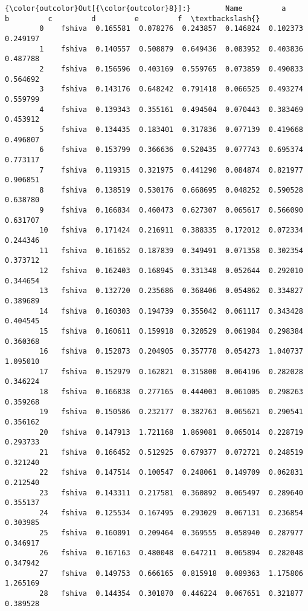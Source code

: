 \documentclass[11pt]{article}
\begin{document}
\begin{Verbatim}[commandchars=\\\{\}]
{\color{outcolor}Out[{\color{outcolor}8}]:}        Name         a         b         c         d         e         f  \textbackslash{}
        0    fshiva  0.165581  0.078276  0.243857  0.146824  0.102373  0.249197   
        1    fshiva  0.140557  0.508879  0.649436  0.083952  0.403836  0.487788   
        2    fshiva  0.156596  0.403169  0.559765  0.073859  0.490833  0.564692   
        3    fshiva  0.143176  0.648242  0.791418  0.066525  0.493274  0.559799   
        4    fshiva  0.139343  0.355161  0.494504  0.070443  0.383469  0.453912   
        5    fshiva  0.134435  0.183401  0.317836  0.077139  0.419668  0.496807   
        6    fshiva  0.153799  0.366636  0.520435  0.077743  0.695374  0.773117   
        7    fshiva  0.119315  0.321975  0.441290  0.084874  0.821977  0.906851   
        8    fshiva  0.138519  0.530176  0.668695  0.048252  0.590528  0.638780   
        9    fshiva  0.166834  0.460473  0.627307  0.065617  0.566090  0.631707   
        10   fshiva  0.171424  0.216911  0.388335  0.172012  0.072334  0.244346   
        11   fshiva  0.161652  0.187839  0.349491  0.071358  0.302354  0.373712   
        12   fshiva  0.162403  0.168945  0.331348  0.052644  0.292010  0.344654   
        13   fshiva  0.132720  0.235686  0.368406  0.054862  0.334827  0.389689   
        14   fshiva  0.160303  0.194739  0.355042  0.061117  0.343428  0.404545   
        15   fshiva  0.160611  0.159918  0.320529  0.061984  0.298384  0.360368   
        16   fshiva  0.152873  0.204905  0.357778  0.054273  1.040737  1.095010   
        17   fshiva  0.152979  0.162821  0.315800  0.064196  0.282028  0.346224   
        18   fshiva  0.166838  0.277165  0.444003  0.061005  0.298263  0.359268   
        19   fshiva  0.150586  0.232177  0.382763  0.065621  0.290541  0.356162   
        20   fshiva  0.147913  1.721168  1.869081  0.065014  0.228719  0.293733   
        21   fshiva  0.166452  0.512925  0.679377  0.072721  0.248519  0.321240   
        22   fshiva  0.147514  0.100547  0.248061  0.149709  0.062831  0.212540   
        23   fshiva  0.143311  0.217581  0.360892  0.065497  0.289640  0.355137   
        24   fshiva  0.125534  0.167495  0.293029  0.067131  0.236854  0.303985   
        25   fshiva  0.160091  0.209464  0.369555  0.058940  0.287977  0.346917   
        26   fshiva  0.167163  0.480048  0.647211  0.065894  0.282048  0.347942   
        27   fshiva  0.149753  0.666165  0.815918  0.089363  1.175806  1.265169   
        28   fshiva  0.144354  0.301870  0.446224  0.067651  0.321877  0.389528   

\end{Verbatim}
\end{document}
